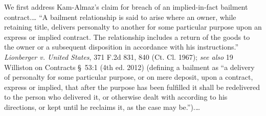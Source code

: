 %
%
%

We first address Kam-Almaz's claim for breach of an implied-in-fact bailment
contract.\ldots
``A bailment relationship is
said to arise where an owner, while retaining title, delivers personalty to
another for some particular purpose upon an express or implied contract. The
relationship includes a return of the goods to the owner or a subsequent
disposition in accordance with his instructions.'' \textit{Lionberger v. United
States}, 371 F.2d 831, 840 (Ct. Cl. 1967); \textit{see also} 19 Williston on
Contracts \S~53:1 (4th ed. 2012) (defining a bailment as ``a delivery of
personalty for some particular purpose, or on mere deposit, upon a contract,
express or implied, that after the purpose has been fulfilled it shall be
redelivered to the person who delivered it, or otherwise dealt with according to
his directions, or kept until he reclaims it, as the case may be.'').\ldots

